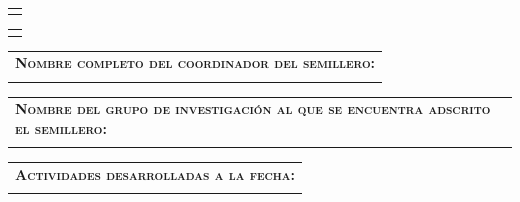 \documentclass[12pt]{report}
\begin{document}
\begin{minipage}{\textwidth}
	\begin{tabular}{l}
		\begin{minipage}[t]{0.7\textwidth}%
			\cellcolor{white!10}{\hotbed}
		\end{minipage}
	\end{tabular}	
	\begin{tabular}{c}
		\begin{minipage}[t]{0.28\textwidth}
			\centering
			\cellcolor{white!10}\textbf{\code}
		\end{minipage}
	\end{tabular}	
\end{minipage}

\begin{minipage}{\textwidth}
	\begin{tabular}{l}
		\begin{minipage}[t]{\textwidth}%
			\cellcolor{blue!10}\textsc{\textbf{Nombre completo del coordinador del semillero:}}
		\end{minipage}
		\vspace{0.1cm}\\
		\begin{minipage}[t]{\textwidth}%
			\cellcolor{white!10}{\leader}
		\end{minipage}
	\end{tabular}	
\end{minipage}

\begin{minipage}{\textwidth}
	\begin{tabular}{l}
		\begin{minipage}[t]{\textwidth}%
			\cellcolor{blue!10}\textsc{\textbf{Nombre del grupo de investigación al que se encuentra adscrito el semillero:}}
		\end{minipage}
		\vspace{0.1cm}\\
		\begin{minipage}[t]{\textwidth}%
			\cellcolor{white!10}{\resgroup}
		\end{minipage}
	\end{tabular}	
\end{minipage}

\vspace{0.3 cm}

\begin{minipage}{\textwidth}
	\begin{tabular}{l}
		\begin{minipage}[t]{\textwidth}%
			\cellcolor{blue!10}\textsc{\textbf{Actividades desarrolladas a la fecha:}}
		\end{minipage}
		\vspace{0.1cm}\\
		\begin{minipage}[t]{\textwidth}%
			\cellcolor{white!10}{\devactivities}
		\end{minipage}
	\end{tabular}	
\end{minipage}
\end{document}
